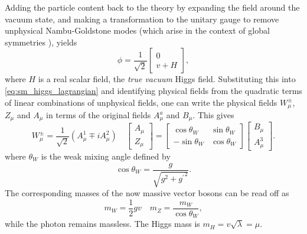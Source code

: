 Adding the particle content back to the theory by expanding the field around the vacuum state, and making a transformation to the unitary gauge to remove unphysical Nambu-Goldstone modes (which arise in the context of global symmetries \cite{PhysRev.117.648,Goldstone1961FieldTW}), yields
%
\begin{equation}\label{eq:unitary_higgs}
  \phi = 
  \frac{1}{\sqrt{2}}
  \begin{bmatrix}
    0 \\ v + H
  \end{bmatrix} ,
\end{equation}
%
where $H$ is a real scalar field, the \textit{true vacuum} Higgs field.
Substituting this into \cref{eq:sm_higgs_lagrangian} and identifying physical fields from the quadratic terms of linear combinations of unphysical fields, one can write the physical fields $W_\mu^\pm$, $Z_\mu$ and $A_\mu$ in terms of the original fields $A^a_\mu$ and $B_\mu$.
This gives
%
\begin{equation}\label{eq:ew_physical_unphysical_fields}
  W_\mu^\pm = 
  \frac{1}{\sqrt{2}} (A^1_\mu \mp i A^2_\mu)
  \quad
  \begin{bmatrix}
    A_\mu \\ Z_\mu
  \end{bmatrix} =
  \begin{bmatrix}
      \cos\theta_W &  \sin\theta_W \\ 
    - \sin\theta_W &  \cos\theta_W
  \end{bmatrix}
  \begin{bmatrix}
    B_\mu \\ A^3_\mu 
  \end{bmatrix} .
\end{equation}
%
where $\theta_W$ is the weak mixing angle defined by 
%
\begin{equation}\label{eq:ew_coupling_weak_mixing_angle}
  \cos\theta_W = \frac{g}{\sqrt{g^2 + {g^\prime}^2}} .
\end{equation}
%
The corresponding masses of the now massive vector bosons can be read off as 
%
\begin{equation}
  m_W = \frac{1}{2} g v
  \quad
  m_Z = \frac{m_W}{\cos\theta_W} , %
\end{equation}
%
while the photon remains massless.
The Higgs mass is $m_H = v \sqrt{\lambda} = \mu$.

